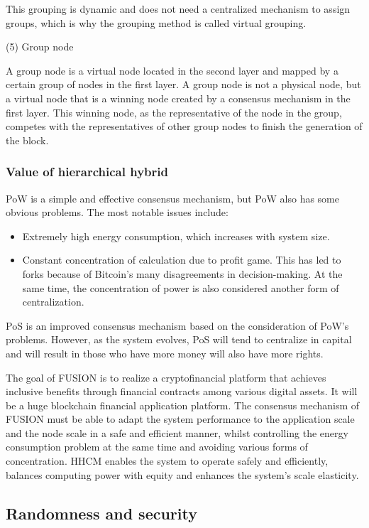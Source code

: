 \documentclass[a4paper,12pt]{article}
\begin{document}
This grouping is dynamic and does not need a centralized mechanism to assign groups, which is why the grouping method is called virtual grouping.

(5) Group node

A group node is a virtual node located in the second layer and mapped by a certain group of nodes in the first layer. A group node is not a physical node, but a virtual node that is a winning node created by a consensus mechanism in the first layer. This winning node, as the representative of the node in the group, competes with the representatives of other group nodes to finish the generation of the block.

\subsubsection{Value of hierarchical hybrid}

PoW is a simple and effective consensus mechanism, but PoW also has some obvious problems. The most notable issues include:
\begin{itemize} [itemindent = 1em]
\item Extremely high energy consumption, which increases with system size.
\item Constant concentration of calculation due to profit game. This has led to forks because of Bitcoin's many disagreements in decision-making. At the same time, the concentration of power is also considered another form of centralization.
\end{itemize}

PoS is an improved consensus mechanism based on the consideration of PoW's problems. However, as the system evolves, PoS will tend to centralize in capital and will result in those who have more money will also have more rights.

The goal of FUSION is to realize a cryptofinancial platform that achieves inclusive benefits through financial contracts among various digital assets. It will be a huge blockchain financial application platform. The consensus mechanism of FUSION must be able to adapt the system performance to the application scale and the node scale in a safe and efficient manner, whilst controlling the energy consumption problem at the same time and avoiding various forms of concentration. HHCM enables the system to operate safely and efficiently, balances computing power with equity and enhances the system's scale elasticity.

\subsection {Randomness and security}
\end{document}
